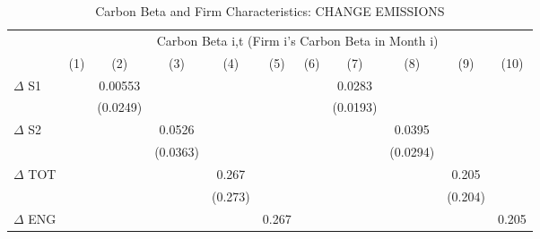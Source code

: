 \begin{table}[htbp]\centering
\def\sym#1{\ifmmode^{#1}\else\(^{#1}\)\fi}
\caption{Carbon Beta and Firm Characteristics: CHANGE EMISSIONS}
\begin{tabular}{l*{10}{c}}
\hline\hline
                &\multicolumn{10}{c}{Carbon Beta i,t (Firm i's Carbon Beta in Month i)}                                                                                                                       \\\cmidrule(lr){2-11}
                &\multicolumn{1}{c}{(1)}         &\multicolumn{1}{c}{(2)}         &\multicolumn{1}{c}{(3)}         &\multicolumn{1}{c}{(4)}         &\multicolumn{1}{c}{(5)}         &\multicolumn{1}{c}{(6)}         &\multicolumn{1}{c}{(7)}         &\multicolumn{1}{c}{(8)}         &\multicolumn{1}{c}{(9)}         &\multicolumn{1}{c}{(10)}         \\
\hline
$\Delta$ S1     &                  &  0.00553         &                  &                  &                  &                  &   0.0283         &                  &                  &                  \\
                &                  & (0.0249)         &                  &                  &                  &                  & (0.0193)         &                  &                  &                  \\
$\Delta$ S2     &                  &                  &   0.0526         &                  &                  &                  &                  &   0.0395         &                  &                  \\
                &                  &                  & (0.0363)         &                  &                  &                  &                  & (0.0294)         &                  &                  \\
$\Delta$ TOT    &                  &                  &                  &    0.267         &                  &                  &                  &                  &    0.205         &                  \\
                &                  &                  &                  &  (0.273)         &                  &                  &                  &                  &  (0.204)         &                  \\
$\Delta$ ENG    &                  &                  &                  &                  &    0.267         &                  &                  &                  &                  &    0.205         \\

\end{tabular}
\end{table}

